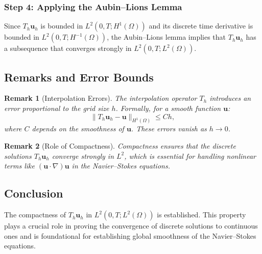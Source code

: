 \documentclass[12pt]{article}
\newtheorem{remark}{Remark}
\begin{document}
\subsubsection{Step 4: Applying the Aubin--Lions Lemma}

Since $T_h \mathbf{u}_h$ is bounded in $L^2(0,T; H^1(\Omega))$ and its discrete time derivative is bounded in $L^2(0,T; H^{-1}(\Omega))$, the Aubin--Lions lemma implies that $T_h \mathbf{u}_h$ has a subsequence that converges strongly in $L^2(0,T; L^2(\Omega))$.

\subsection{Remarks and Error Bounds}

\begin{remark}[Interpolation Errors]
The interpolation operator $T_h$ introduces an error proportional to the grid size $h$. Formally, for a smooth function $\mathbf{u}$:
\begin{equation}
\|T_h \mathbf{u}_h - \mathbf{u}\|_{H^1(\Omega)} \leq Ch,
\end{equation}
where $C$ depends on the smoothness of $\mathbf{u}$. These errors vanish as $h \to 0$.
\end{remark}

\begin{remark}[Role of Compactness]
Compactness ensures that the discrete solutions $T_h \mathbf{u}_h$ converge strongly in $L^2$, which is essential for handling nonlinear terms like $(\mathbf{u} \cdot \nabla) \mathbf{u}$ in the Navier--Stokes equations.
\end{remark}

\subsection{Conclusion}

The compactness of $T_h \mathbf{u}_h$ in $L^2(0,T; L^2(\Omega))$ is established. This property plays a crucial role in proving the convergence of discrete solutions to continuous ones and is foundational for establishing global smoothness of the Navier--Stokes equations.
\end{document}
